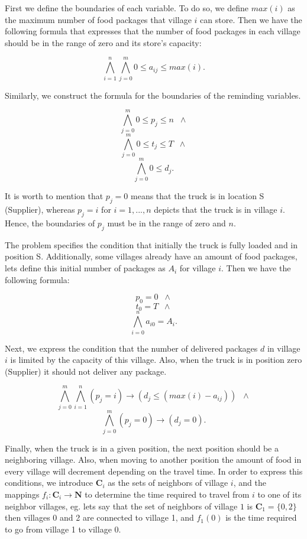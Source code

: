 \documentclass[a4paper]{article}
\begin{document}
First we define the boundaries of each variable. To do so, we define $max(i)$ as the maximum number of food packages that village $i$ can store. Then we have the following formula that expresses that the number of food packages in each village should be in the range of zero and its store's capacity:

\[ \bigwedge_{i=1}^n \bigwedge_{j=0}^m 0 \leq a_{ij} \leq max(i).\]

Similarly, we construct the formula for the boundaries of the reminding variables.

\[\bigwedge_{j=0}^m 0 \leq p_j \leq n\;\;\wedge\]
\[\bigwedge_{j=0}^m 0 \leq t_j \leq T\;\;\wedge\]
\[\bigwedge_{j=0}^m 0 \leq d_j.\]

It is worth to mention that $p_j = 0$ means that the truck is in location S (Supplier), whereas $p_j = i$ for $i=1,...,n$ depicts that the truck is in village $i$. Hence, the boundaries of $p_j$ must be in the range of zero and $n$.

The problem specifies the condition that initially the truck is fully loaded and in position S. Additionally, some villages already have an amount of food packages, lets define this initial number of packages as $A_i$ for village $i$. Then we have the following formula:

\[p_0 = 0 \;\;\wedge\]
\[t_0 = T \;\;\wedge\]
\[\bigwedge_{i=0}^n a_{i0} = A_i.\]

Next, we express the condition that the number of delivered packages $d$ in village $i$ is limited by the capacity of this village. Also, when the truck is in position zero (Supplier) it should not deliver any package.

\[\bigwedge_{j=0}^m \bigwedge_{i=1}^n (p_j = i) \rightarrow (d_j \leq (max(i) - a_{ij})) \;\;\wedge\]
\[\bigwedge_{j=0}^m (p_j = 0) \rightarrow (d_j = 0) .\]

Finally, when the truck is in a given position, the next position should be a neighboring village. Also, when moving to another position the amount of food in every village will decrement depending on the travel time. In order to express this conditions, we introduce $\textbf{C}_i$ as the sets of neighbors of village $i$, and the mappings $f_i:\textbf{C}_i \rightarrow \textbf{N}$ to determine the time required to travel from $i$ to one of its neighbor villages, eg. lets say that the set of neighbors of village $1$ is $\textbf{C}_1 = \{0,2\}$ then villages 0 and 2 are connected to village 1, and $f_1(0)$ is the time required to go from village 1 to village 0.
\end{document}
